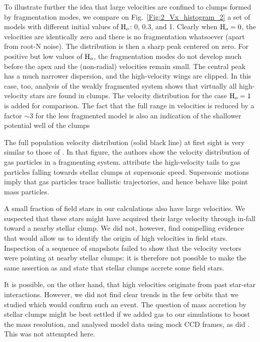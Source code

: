 To illustrate further the idea that large velocities are confined to clumps formed by fragmentation modes, we compare on Fig.~\ref{Fig:2_Vx_histogram_2} a set of models 
with different initial  values of  ${\textrm{H}}_o$: 0, 0.3, and 1. 
Clearly when ${\textrm{H}}_o=0$, the velocities are identically zero and there is no fragmentation whatsoever (apart from root-N noise). The distribution is then a sharp peak centered on zero. For positive but low values of ${\textrm{H}}_o$, the fragmentation modes do not develop much before the apex and the (non-radial) velocities remain small. The central peak  has a much narrower dispersion, and the high-velocity wings are clipped. In this case, too, analysis of the  weakly fragmented system shows that virtually all high-velocity stars are found in clumps. The velocity distribution for the case  ${\textrm{H}}_o = 1$ is added for comparison. The fact that the full range in velocities is reduced by a factor $\sim 3$ for the 
less fragmented model is also an indication of the shallower potential well of the clumps

The full population velocity distribution (solid black line) at first sight is very similar to those of \citet[Fig.~5]{Klessen2000}. In that figure, the authors show the velocity distribution of gas particles in a fragmenting system. \citeauthor{Klessen2000} attribute the high-velocity tails to gas particles falling towards stellar clumps at supersonic speed. Supersonic motions imply that gas particles trace ballistic trajectories, and hence behave like point mass particles. 

A small fraction of field stars in our calculations also have large velocities. We suspected that these stars might have acquired their large velocity through in-fall toward a nearby stellar clump. We did not, however,  find compelling evidence that would allow us to identify the origin of high velocities in field stars. Inspection of a sequence of snapshots failed to show that the velocity vectors were pointing at nearby stellar clumps: it is therefore not possible to make the same assertion as \citeauthor{Klessen2000} and state that stellar clumps accrete some field stars.

It is possible, on the other hand,  that high velocities originate from past star-star interactions. However, we did not find clear trends in the few orbits that we studied which would confirm such an event. The question of mass accretion by stellar clumps might be best settled if we added gas to our simulations to boost the mass resolution, and analysed model data using mock CCD frames, as did \citeauthor{Klessen2000}. This was not attempted here.

